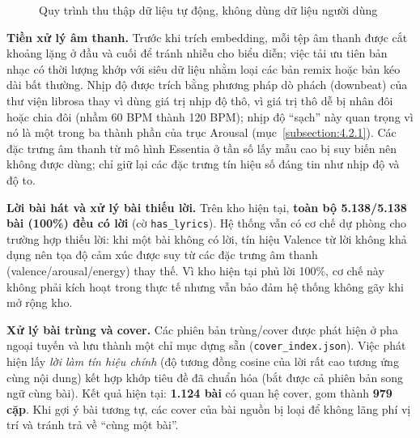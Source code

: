 \documentclass[../DoAn.tex]{subfiles}
\begin{document}
\begin{figure}[h!]
\centering
{}
\caption{Quy trình thu thập dữ liệu tự động, không dùng dữ liệu người dùng}
\label{fig:collect}
\end{figure}

\textbf{Tiền xử lý âm thanh.} Trước khi trích embedding, mỗi tệp âm thanh được cắt khoảng lặng ở đầu và cuối để tránh nhiễu cho biểu diễn; việc tải ưu tiên bản nhạc có thời lượng khớp với siêu dữ liệu nhằm loại các bản remix hoặc bản kéo dài bất thường. Nhịp độ được trích bằng phương pháp dò phách (downbeat) của thư viện librosa thay vì dùng giá trị nhịp độ thô, vì giá trị thô dễ bị nhân đôi hoặc chia đôi (nhầm 60 BPM thành 120 BPM); nhịp độ ``sạch'' này quan trọng vì nó là một trong ba thành phần của trục Arousal (mục~\ref{subsection:4.2.1}). Các đặc trưng âm thanh từ mô hình Essentia ở tần số lấy mẫu cao bị suy biến nên không được dùng; chỉ giữ lại các đặc trưng tín hiệu số đáng tin như nhịp độ và độ to.

\textbf{Lời bài hát và xử lý bài thiếu lời.} Trên kho hiện tại, \textbf{toàn bộ 5.138/5.138 bài (100\%) đều có lời} (cờ \texttt{has\_lyrics}). Hệ thống vẫn có cơ chế dự phòng cho trường hợp thiếu lời: khi một bài không có lời, tín hiệu Valence từ lời không khả dụng nên tọa độ cảm xúc được suy từ các đặc trưng âm thanh (valence/\allowbreak arousal/\allowbreak energy) thay thế. Vì kho hiện tại phủ lời 100\%, cơ chế này không phải kích hoạt trong thực tế nhưng vẫn bảo đảm hệ thống không gãy khi mở rộng kho.

\textbf{Xử lý bài trùng và cover.} Các phiên bản trùng/cover được phát hiện ở pha ngoại tuyến và lưu thành một chỉ mục dựng sẵn (\texttt{cover\_index.json}). Việc phát hiện lấy \textit{lời làm tín hiệu chính} (độ tương đồng cosine của lời rất cao tương ứng cùng nội dung) kết hợp khớp tiêu đề đã chuẩn hóa (bắt được cả phiên bản song ngữ cùng bài). Kết quả hiện tại: \textbf{1.124 bài} có quan hệ cover, gom thành \textbf{979 cặp}. Khi gợi ý bài tương tự, các cover của bài nguồn bị loại để không lãng phí vị trí và tránh trả về ``cùng một bài''.
\end{document}
